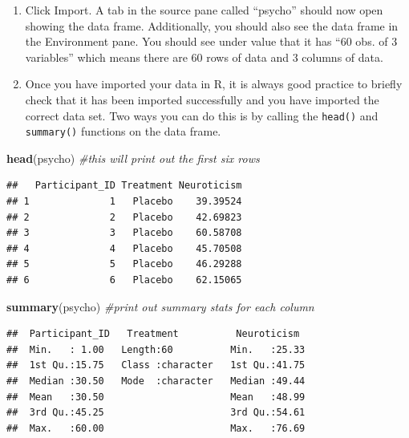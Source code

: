 \documentclass[
]{book}
\newenvironment{Shaded}{\begin{snugshade}}{\end{snugshade}}
\newcommand{\CommentTok}[1]{\textcolor[rgb]{0.56,0.35,0.01}{\textit{#1}}}
\newcommand{\FunctionTok}[1]{\textcolor[rgb]{0.13,0.29,0.53}{\textbf{#1}}}
\newcommand{\NormalTok}[1]{#1}
\providecommand{\tightlist}{%
  \setlength{\itemsep}{0pt}\setlength{\parskip}{0pt}}
\begin{document}
\begin{enumerate}
\def\labelenumi{\arabic{enumi}.}
\setcounter{enumi}{7}
\tightlist
\item
  Click Import. A tab in the source pane called ``psycho'' should now open showing the data frame. Additionally, you should also see the data frame in the Environment pane. You should see under value that it has ``60 obs. of 3 variables'' which means there are 60 rows of data and 3 columns of data.
\item
  Once you have imported your data in R, it is always good practice to briefly check that it has been imported successfully and you have imported the correct data set. Two ways you can do this is by calling the \texttt{head()} and \texttt{summary()} functions on the data frame.
\end{enumerate}

\begin{Shaded}
\begin{Highlighting}[]
\FunctionTok{head}\NormalTok{(psycho) }\CommentTok{\#this will print out the first six rows}
\end{Highlighting}
\end{Shaded}

\begin{verbatim}
##   Participant_ID Treatment Neuroticism
## 1              1   Placebo    39.39524
## 2              2   Placebo    42.69823
## 3              3   Placebo    60.58708
## 4              4   Placebo    45.70508
## 5              5   Placebo    46.29288
## 6              6   Placebo    62.15065
\end{verbatim}

\begin{Shaded}
\begin{Highlighting}[]
\FunctionTok{summary}\NormalTok{(psycho) }\CommentTok{\#print out summary stats for each column}
\end{Highlighting}
\end{Shaded}

\begin{verbatim}
##  Participant_ID   Treatment          Neuroticism   
##  Min.   : 1.00   Length:60          Min.   :25.33  
##  1st Qu.:15.75   Class :character   1st Qu.:41.75  
##  Median :30.50   Mode  :character   Median :49.44  
##  Mean   :30.50                      Mean   :48.99  
##  3rd Qu.:45.25                      3rd Qu.:54.61  
##  Max.   :60.00                      Max.   :76.69
\end{verbatim}
\end{document}
